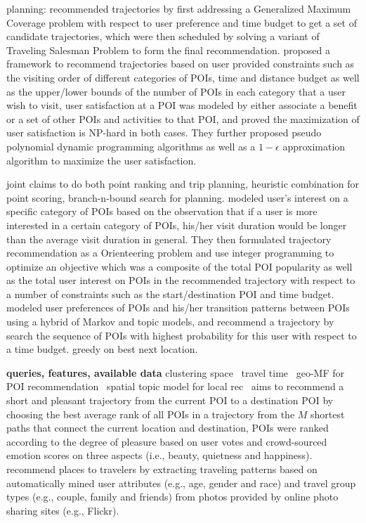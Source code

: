 planning:
\cite{tripbuilder15} recommended trajectories by first addressing a Generalized Maximum Coverage problem with respect to user preference and 
time budget to get a set of candidate trajectories, which were then scheduled by solving a variant of Traveling Salesman Problem to form the 
final recommendation.
\cite{wsdm14} proposed a framework to recommend trajectories based on user provided constraints such as the visiting order of different 
categories of POIs, time and distance budget as well as the upper/lower bounds of the number of POIs in each category that a user wish 
to visit, user satisfaction at a POI was modeled by either associate a benefit or a set of other POIs and activities to that POI,
and proved the maximization of user satisfaction is NP-hard in both cases. 
They further proposed pseudo polynomial dynamic programming algorithms as well as 
a $1-\epsilon$ approximation algorithm to maximize the user satisfaction.


joint
\cite{lu2012personalized} claims to do both point ranking and trip planning, heuristic combination for point scoring, branch-n-bound search for planning. 
\cite{ijcai15} modeled user's interest on a specific category of POIs based on the observation that if a user is more interested in a certain category of POIs, his/her visit duration would be longer than the average visit duration in general. They then formulated trajectory recommendation as a Orienteering problem and use integer programming to optimize an objective which was a composite of the total POI popularity as well as the total user interest on POIs in the recommended trajectory 
with respect to a number of constraints such as the start/destination POI and time budget.
\cite{kurashima2010geotag} modeled user preferences of POIs and his/her transition patterns 
between POIs using a hybrid of 
Markov and topic models, and recommend a trajectory by search the sequence of POIs with highest probability for this user  with respect to a time budget.
greedy on best next location. 

\cite{chen2015tripplanner}

{\bf queries, features, available data}
clustering space~\cite{hu2013spatialtopic}
travel time~\cite{gao2013temporal}
geo-MF for POI recommendation~\cite{lian2014geomf}
spatial topic model for local rec~\cite{hu2013spatialtopic}
\cite{ht14} aims to recommend a short and pleasant trajectory from the current POI to a destination POI by choosing the best average rank 
of all POIs in a trajectory from the $M$ shortest paths that connect the current location and destination,
POIs were ranked according to the degree of pleasure based on user votes and  crowd-sourced emotion scores on three aspects 
(i.e., beauty, quietness and happiness).
\cite{travel13} recommend places to travelers by extracting traveling patterns based on automatically mined user attributes 
(e.g., age, gender and race) and travel group types (e.g., couple, family and friends) from photos provided by online photo 
sharing sites (e.g., Flickr).


